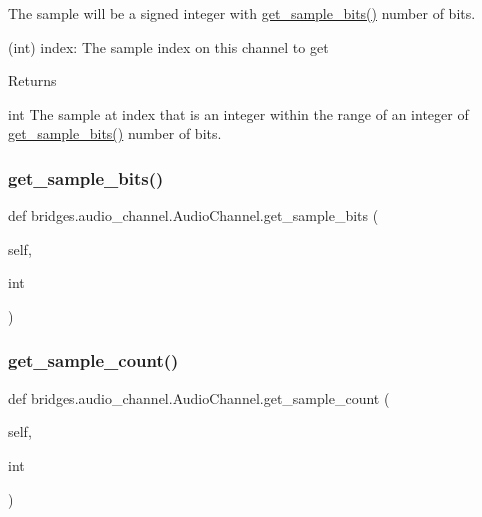 The sample will be a signed integer with \hyperlink{classbridges_1_1audio__channel_1_1_audio_channel_ae9b2e6e0f5aaebc5adc21815f4fe2f9a}{get\+\_\+sample\+\_\+bits()} number of bits. \begin{DoxyVerb}           (int) index: The sample index on this channel to get
\end{DoxyVerb}
 \begin{DoxyReturn}{Returns}


int The sample at index that is an integer within the range of an integer of \hyperlink{classbridges_1_1audio__channel_1_1_audio_channel_ae9b2e6e0f5aaebc5adc21815f4fe2f9a}{get\+\_\+sample\+\_\+bits()} number of bits. 
\end{DoxyReturn}
\mbox{\label{classbridges_1_1audio__channel_1_1_audio_channel_ae9b2e6e0f5aaebc5adc21815f4fe2f9a}} 
\subsubsection{\texorpdfstring{get\+\_\+sample\+\_\+bits()}{get\_sample\_bits()}}
{\footnotesize\ttfamily def bridges.\+audio\+\_\+channel.\+Audio\+Channel.\+get\+\_\+sample\+\_\+bits (\begin{DoxyParamCaption}\item[{}]{self,  }\item[{}]{int }\end{DoxyParamCaption})}

\mbox{\label{classbridges_1_1audio__channel_1_1_audio_channel_a5d4780923b9c11029a1d6847db5480d2}} 
\subsubsection{\texorpdfstring{get\+\_\+sample\+\_\+count()}{get\_sample\_count()}}
{\footnotesize\ttfamily def bridges.\+audio\+\_\+channel.\+Audio\+Channel.\+get\+\_\+sample\+\_\+count (\begin{DoxyParamCaption}\item[{}]{self,  }\item[{}]{int }\end{DoxyParamCaption})}



